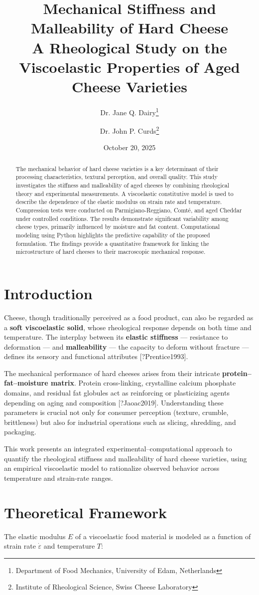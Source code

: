 \documentclass[a4paper,twoside]{article}
\title{Mechanical Stiffness and Malleability of Hard Cheese\\[0.5em]\large A Rheological Study on the Viscoelastic Properties of Aged Cheese Varieties}
\author{Dr. Jane Q. Dairy\thanks{Department of Food Mechanics, University of Edam, Netherlands} \and Dr. John P. Curds\thanks{Institute of Rheological Science, Swiss Cheese Laboratory}}\date{October 20, 2025}
\begin{document}
\maketitle
\begin{abstract}
The mechanical behavior of hard cheese varieties is a key determinant of their
processing characteristics, textural perception, and overall quality. This study
investigates the stiffness and malleability of aged cheeses by combining
rheological theory and experimental measurements. A viscoelastic constitutive
model is used to describe the dependence of the elastic modulus on strain rate
and temperature. Compression tests were conducted on Parmigiano-Reggiano, Comté,
and aged Cheddar under controlled conditions. The results demonstrate significant
variability among cheese types, primarily influenced by moisture and fat content.
Computational modeling using Python highlights the predictive capability of the
proposed formulation. The findings provide a quantitative framework for linking
the microstructure of hard cheeses to their macroscopic mechanical response.
\end{abstract}
\section{Introduction}
Cheese, though traditionally perceived as a food product, can also be regarded
as a \textbf{soft viscoelastic solid}, whose rheological response depends on both time
and temperature. The interplay between its \textbf{elastic stiffness} --- resistance
to deformation --- and \textbf{malleability} --- the capacity to deform without
fracture --- defines its sensory and functional attributes [?Prentice1993].

The mechanical performance of hard cheeses arises from their intricate
\textbf{protein--fat--moisture matrix}. Protein cross-linking, crystalline calcium
phosphate domains, and residual fat globules act as reinforcing or plasticizing
agents depending on aging and composition [?Jaoac2019]. Understanding these
parameters is crucial not only for consumer perception (texture, crumble,
brittleness) but also for industrial operations such as slicing, shredding,
and packaging.

This work presents an integrated experimental--computational approach to quantify
the rheological stiffness and malleability of hard cheese varieties, using an
empirical viscoelastic model to rationalize observed behavior across temperature
and strain-rate ranges.
\section{Theoretical Framework}
The elastic modulus $E$ of a viscoelastic food material is modeled as a function
of strain rate $\dot{\varepsilon}$ and temperature $T$:
\end{document}
